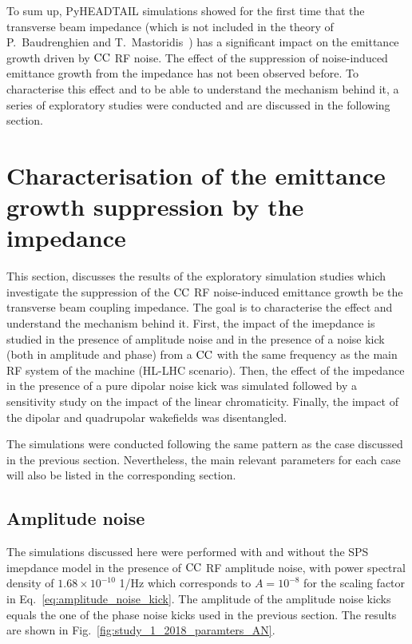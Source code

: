To sum up, PyHEADTAIL simulations showed for the first time that the transverse beam impedance (which is not included in the theory of P.~Baudrenghien and T.~Mastoridis~\cite{PhysRevSTAB.18.101001}) has a significant impact on the emittance growth driven by ${\mathrm{CC}}$ RF noise. The effect of the suppression of noise-induced emittance growth from the impedance has not been observed before. 
To characterise this effect and to be able to understand the mechanism behind it, a series of exploratory studies were conducted and are discussed in the following section. 


\section{Characterisation of the emittance growth suppression by the impedance}\label{sec:emittance_growth_exploratory_studies}

This section, discusses the results of the exploratory simulation studies which investigate the suppression of the ${\mathrm{CC}}$ RF noise-induced emittance growth be the transverse beam coupling impedance. The goal is to characterise the effect and understand the mechanism behind it. First, the impact of the imepdance is studied in the presence of amplitude noise and in the presence of a noise kick (both in amplitude and phase) from a ${\mathrm{CC}}$ with the same frequency as the main RF system of the machine (HL-LHC scenario). Then, the effect of the impedance in the presence of a pure dipolar noise kick was simulated followed by a sensitivity study on the impact of the linear chromaticity. Finally, the impact of the dipolar and quadrupolar wakefields was disentangled. 

The simulations were conducted following the same pattern as the case discussed in the previous section. Nevertheless, the main relevant parameters for each case will also be listed in the corresponding section.

\subsection{Amplitude noise}\label{subsec:amplitude_noise}
The simulations discussed here were performed with and without the SPS imepdance model in the presence of ${\mathrm{CC}}$ RF amplitude noise, with power spectral density of $1.68 \times 10^{-10}$ 1/Hz which corresponds to $A=10^{-8}$ for the scaling factor in Eq.~\eqref{eq:amplitude_noise_kick}. The amplitude of the amplitude noise kicks equals the one of the phase noise kicks used in the previous section. The results are shown in Fig.~\ref{fig:study_1_2018_paramters_AN}.

